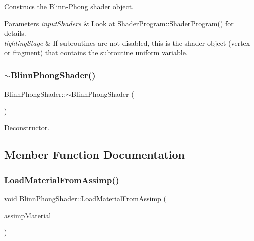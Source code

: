Construcs the Blinn-\/\+Phong shader object. 


\begin{DoxyParams}{Parameters}
{\em input\+Shaders} & Look at \hyperlink{class_shader_program_aba2db5734b2f70cc34078126ad279588}{Shader\+Program\+::\+Shader\+Program()} for details. \\
\hline
{\em lighting\+Stage} & If subroutines are not disabled, this is the shader object (vertex or fragment) that contains the subroutine uniform variable. \\
\hline
\end{DoxyParams}
\hypertarget{class_blinn_phong_shader_a5d7a46de957e0676ed4ceb00f7399a39}{}\label{class_blinn_phong_shader_a5d7a46de957e0676ed4ceb00f7399a39} 
\subsubsection{\texorpdfstring{$\sim$\+Blinn\+Phong\+Shader()}{~BlinnPhongShader()}}
{\footnotesize\ttfamily Blinn\+Phong\+Shader\+::$\sim$\+Blinn\+Phong\+Shader (\begin{DoxyParamCaption}{ }\end{DoxyParamCaption})\hspace{0.3cm}{\ttfamily [virtual]}}



Deconstructor. 



\subsection{Member Function Documentation}
\hypertarget{class_blinn_phong_shader_a5a2a720a403f3d005b07a96fee35b95b}{}\label{class_blinn_phong_shader_a5a2a720a403f3d005b07a96fee35b95b} 
\subsubsection{\texorpdfstring{Load\+Material\+From\+Assimp()}{LoadMaterialFromAssimp()}}
{\footnotesize\ttfamily void Blinn\+Phong\+Shader\+::\+Load\+Material\+From\+Assimp (\begin{DoxyParamCaption}\item[{std\+::shared\+\_\+ptr$<$ struct ai\+Material $>$}]{assimp\+Material }\end{DoxyParamCaption})\hspace{0.3cm}{\ttfamily [virtual]}}




